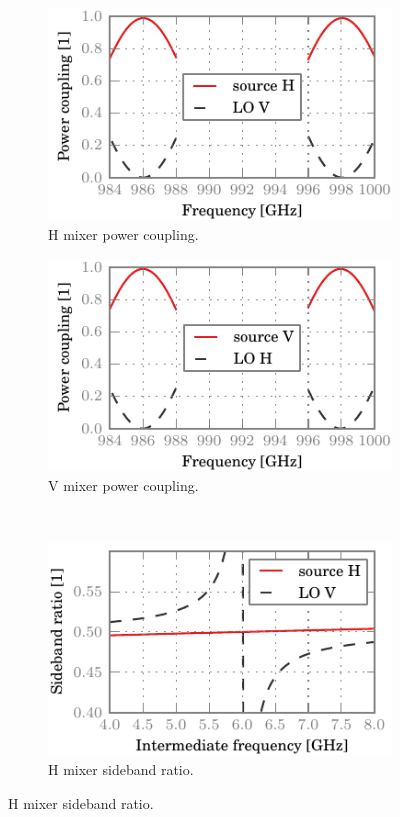 \begin{figure}[hbtp]
    \centering
    \begin{subfigure}[b]{.5\textwidth}
        \includegraphics{chapter_3/02_realgrids_h_dsb}%
        \caption{H mixer power coupling.}
    \end{subfigure}%
    \begin{subfigure}[b]{.5\textwidth}
        \includegraphics{chapter_3/02_realgrids_v_dsb}%
        \caption{V mixer power coupling.}
    \end{subfigure}%
    \\
    \begin{subfigure}[b]{.5\textwidth}
        \includegraphics{chapter_3/02_realgrids_h_sbr}%
        \caption{H mixer sideband ratio.}
    \end{subfigure}%

\end{figure}
